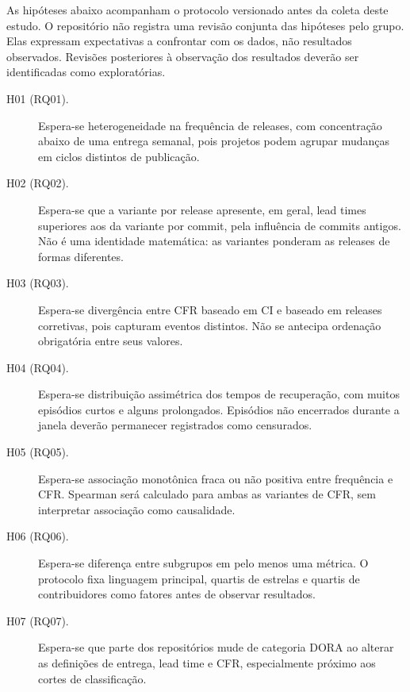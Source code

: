 As hipóteses abaixo acompanham o protocolo versionado antes da coleta deste
estudo. O repositório não registra uma revisão conjunta das hipóteses pelo
grupo. Elas expressam expectativas a confrontar com os dados, não resultados
observados. Revisões posteriores à observação dos resultados deverão ser
identificadas como exploratórias.

\begin{description}
\item[H01 (RQ01).] Espera-se heterogeneidade na frequência de releases,
com concentração abaixo de uma entrega semanal, pois projetos podem
agrupar mudanças em ciclos distintos de publicação.
\item[H02 (RQ02).] Espera-se que a variante por release apresente, em geral,
lead times superiores aos da variante por commit, pela influência de commits
antigos. Não é uma identidade matemática: as variantes ponderam as releases
de formas diferentes.
\item[H03 (RQ03).] Espera-se divergência entre CFR baseado em CI e baseado
em releases corretivas, pois capturam eventos distintos. Não se antecipa
ordenação obrigatória entre seus valores.
\item[H04 (RQ04).] Espera-se distribuição assimétrica dos tempos de
recuperação, com muitos episódios curtos e alguns prolongados. Episódios
não encerrados durante a janela deverão permanecer registrados como censurados.
\item[H05 (RQ05).] Espera-se associação monotônica fraca ou não positiva
entre frequência e CFR. Spearman será calculado para ambas as variantes
de CFR, sem interpretar associação como causalidade.
\item[H06 (RQ06).] Espera-se diferença entre subgrupos em pelo menos uma
métrica. O protocolo fixa linguagem principal, quartis de estrelas e quartis
de contribuidores como fatores antes de observar resultados.
\item[H07 (RQ07).] Espera-se que parte dos repositórios mude de categoria
DORA ao alterar as definições de entrega, lead time e CFR, especialmente
próximo aos cortes de classificação.
\end{description}
